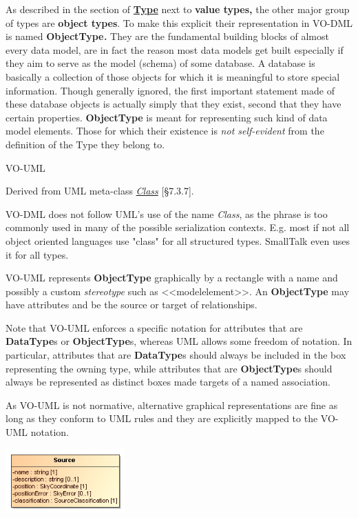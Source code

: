 \documentclass[10pt,a4paper]{ivoa}
\begin{document}
As described in the section of
\protect\hyperlink{type-extends-referableelement}{\textbf{Type}} next to
\textbf{value types,} the other major group of types are \textbf{object
types}. To make this explicit their representation in VO-DML is named
\textbf{ObjectType\emph{.}} They are the fundamental building blocks of
almost every data model, are in fact the reason most data models get
built especially if they aim to serve as the model (schema) of some
database. A database is basically a collection of those objects for
which it is meaningful to store special information. Though generally
ignored, the first important statement made of these database objects is
actually simply that they exist, second that they have certain
properties. \textbf{ObjectType} is meant for representing such kind of
data model elements. Those for which their existence is \emph{not
self-evident} from the definition of the Type they belong to.

VO-UML

Derived from UML meta-class
\href{http://www.uml-diagrams.org/class-diagrams.html\#class}{\emph{Class}}
{[}§7.3.7{]}.

VO-DML does not follow UML's use of the name \emph{Class}, as the phrase
is too commonly used in many of the possible serialization contexts.
E.g. most if not all object oriented languages use "class" for all
structured types. SmallTalk even uses it for all types.

VO-UML represents \textbf{ObjectType} graphically by a rectangle with a
name and possibly a custom \emph{stereotype} such as
\textless\textless modelelement\textgreater\textgreater. An
\textbf{ObjectType} may have attributes and be the source or target of
relationships.

Note that VO-UML enforces a specific notation for attributes that are
\textbf{DataType}s or \textbf{ObjectType}s, whereas UML allows some
freedom of notation. In particular, attributes that are
\textbf{DataType}s should always be included in the box representing the
owning type, while attributes that are \textbf{ObjectType}s should
always be represented as distinct boxes made targets of a named
association.

As VO-UML is not normative, alternative graphical representations are
fine as long as they conform to UML rules and they are explicitly mapped
to the VO-UML notation.

\includegraphics[width=1.8in,height=0.96667in]{./media/image16.png}
\end{document}

